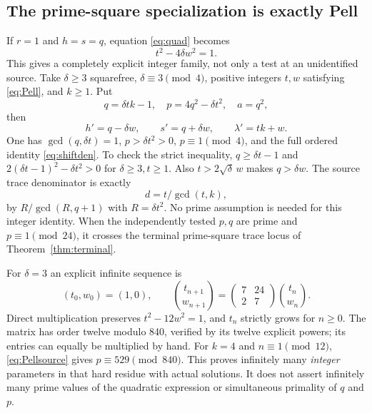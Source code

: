 \subsection{The prime-square specialization is exactly Pell}
If $r=1$ and $h=s=q$, equation \eqref{eq:quad} becomes
\begin{equation}\label{eq:Pell}
 t^2-4\delta w^2=1.
\end{equation}
This gives a completely explicit integer family, not only a test at an
unidentified source. Take $\delta\ge3$ squarefree, $\delta\equiv3\pmod4$,
positive integers $t,w$ satisfying \eqref{eq:Pell}, and $k\ge1$. Put
\begin{equation}\label{eq:Pellsource}
 q=\delta tk-1,\quad p=4q^2-\delta t^2,
 \quad a=q^2,
\end{equation}
then
\begin{equation}\label{eq:Pellout}
 h'=q-\delta w,\qquad s'=q+\delta w,\qquad
 \lambda'=tk+w.
\end{equation}
One has $\gcd(q,\delta t)=1$, $p>\delta t^2>0$, $p\equiv1\pmod4$, and the
full ordered identity \eqref{eq:shiftden}. To check the strict inequality,
$q\ge\delta t-1$ and
$2(\delta t-1)^2-\delta t^2>0$ for $\delta\ge3,t\ge1$.
Also $t>2\sqrt\delta\,w$ makes $q>\delta w$.
The source trace denominator is exactly
\[
 d=t/\gcd(t,k),
\]
by $R/\gcd(R,q+1)$ with $R=\delta t^2$.
No prime assumption is needed for this integer identity. When the independently
tested $p,q$ are prime and $p\equiv1\pmod{24}$, it crosses the terminal
prime-square trace locus of Theorem~\ref{thm:terminal}.

For $\delta=3$ an explicit infinite sequence is
\[
 (t_0,w_0)=(1,0),\qquad
 \binom{t_{n+1}}{w_{n+1}}
 =\begin{pmatrix}7&24\\2&7\end{pmatrix}\binom{t_n}{w_n}.
\]
Direct multiplication preserves $t^2-12w^2=1$, and $t_n$ strictly grows for
$n\ge0$. The matrix has order twelve modulo 840, verified by its twelve
explicit powers; its entries can equally be multiplied by hand. For $k=4$
and $n\equiv1\pmod{12}$, \eqref{eq:Pellsource} gives $p\equiv529\pmod{840}$.
This proves infinitely many \emph{integer} parameters in that hard residue
with actual solutions. It does not assert infinitely many prime values of the
quadratic expression or simultaneous primality of $q$ and $p$.

